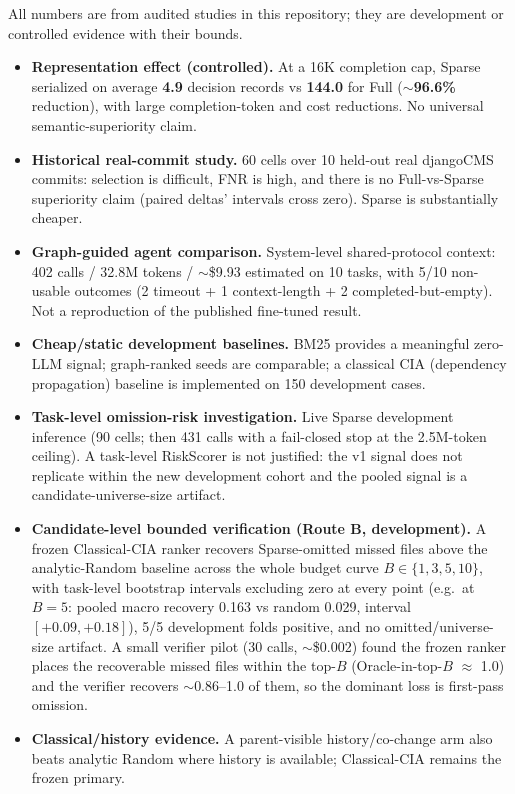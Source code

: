 \documentclass[11pt,a4paper]{article}
\begin{document}
All numbers are from audited studies in this repository; they are development
or controlled evidence with their bounds.

\begin{itemize}
  \item \textbf{Representation effect (controlled).} At a 16K completion cap,
        Sparse serialized on average \textbf{4.9} decision records vs
        \textbf{144.0} for Full ($\sim$\textbf{96.6\%} reduction), with large
        completion-token and cost reductions. No universal semantic-superiority
        claim.
  \item \textbf{Historical real-commit study.} 60 cells over 10 held-out real
        djangoCMS commits: selection is difficult, FNR is high, and there is no
        Full-vs-Sparse superiority claim (paired deltas' intervals cross zero).
        Sparse is substantially cheaper.
  \item \textbf{Graph-guided agent comparison.} System-level shared-protocol
        context: 402 calls / 32.8M tokens / $\sim$\$9.93 estimated on 10 tasks,
        with 5/10 non-usable outcomes (2 timeout + 1 context-length + 2
        completed-but-empty). Not a reproduction of the published fine-tuned
        result.
  \item \textbf{Cheap/static development baselines.} BM25 provides a meaningful
        zero-LLM signal; graph-ranked seeds are comparable; a classical CIA
        (dependency propagation) baseline is implemented on 150 development
        cases.
  \item \textbf{Task-level omission-risk investigation.} Live Sparse
        development inference (90 cells; then 431 calls with a fail-closed stop
        at the 2.5M-token ceiling). A task-level RiskScorer is not justified:
        the v1 signal does not replicate within the new development cohort and
        the pooled signal is a candidate-universe-size artifact.
  \item \textbf{Candidate-level bounded verification (Route B, development).}
        A frozen Classical-CIA ranker recovers Sparse-omitted missed files above
        the analytic-Random baseline across the whole budget curve $B \in
        \{1,3,5,10\}$, with task-level bootstrap intervals excluding zero at
        every point (e.g.\ at $B{=}5$: pooled macro recovery 0.163 vs random
        0.029, interval $[+0.09,+0.18]$), 5/5 development folds positive, and no
        omitted/universe-size artifact. A small verifier pilot (30 calls,
        $\sim$\$0.002) found the frozen ranker places the recoverable missed
        files within the top-$B$ (Oracle-in-top-$B$ $\approx$ 1.0) and the
        verifier recovers $\sim$0.86--1.0 of them, so the dominant loss is
        first-pass omission.
  \item \textbf{Classical/history evidence.} A parent-visible history/co-change
        arm also beats analytic Random where history is available; Classical-CIA
        remains the frozen primary.
\end{itemize}
\end{document}
